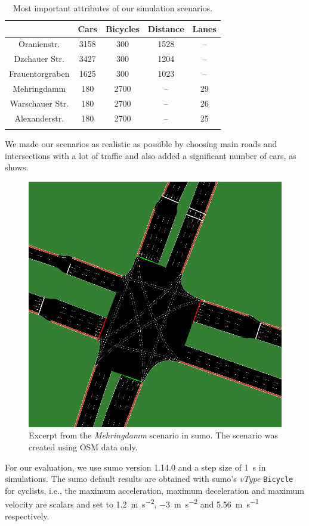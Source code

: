 \begin{table}%
\centering
\caption{Most important attributes of our simulation scenarios.}%
\label{tab:scenarios}
\begin{tabular}{ccccc}%
\toprule%
                & Cars  & Bicycles & Distance & Lanes\\%
\midrule%
\midrule%
Oranienstr.     & \num{3158} & \num{300}      & \num{1528}    & --\\%
Dzchauer Str.   & \num{3427} & \num{300}      & \num{1204}    & --\\%
Frauentorgraben & \num{1625} & \num{300}      & \num{1023}    & --\\%
Mehringdamm     & \num{180}   & \num{2700}    & --       & \num{29}\\%
Warschauer Str. & \num{180}   & \num{2700}    & --       & \num{26}\\%
Alexanderstr.   & \num{180}   & \num{2700}    & --       & \num{25}\\%
\bottomrule&%
\end{tabular}%
\end{table}

We made our scenarios as realistic as possible by choosing main roads and intersections with a lot of traffic and also added a significant number of cars, as  shows.
\begin{figure}
    \centering
    \includegraphics[width=0.5\columnwidth]{fig/mehringdamm_screenshot.png}
    \caption{%
        Excerpt from the \textit{Mehringdamm} scenario in \ac{sumo}.
        The scenario was created using OSM data only.
    }%
    \label{fig:mehringdamm_sumo}
\end{figure}

For our evaluation, we use \ac{sumo} version 1.14.0 and a step size of \SI{1}{\s} in simulations.
The \ac{sumo} default results are obtained with \ac{sumo}'s \textit{vType} \texttt{Bicycle} for cyclists, i.e., the maximum acceleration, maximum deceleration and maximum velocity are scalars and set to \SI{1.2}{\m\per\s\squared}, \SI{-3}{\m\per\s\squared} and \SI{5.56}{\m\per\s} respectively.


